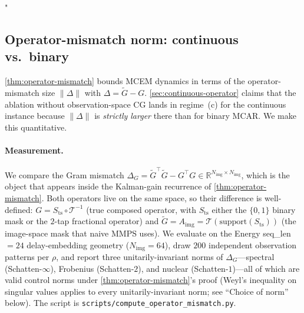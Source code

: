 "\documentclass{article}
\theoremstyle{plain}
\theoremstyle{definition}
\theoremstyle{remark}
\newcommand{\tsimg}{\mathcal{T}}
\newcommand{\imgts}{\mathcal{T}^{-1}}
\newcommand{\Nimg}{N_{\mathrm{img}}}
\newcommand{\Aimg}{A_{\mathrm{img}}}
\begin{document}
\subsection{Operator-mismatch norm: continuous vs.\ binary}
\label{app:continuous-mismatch-norm}

\cref{thm:operator-mismatch} bounds MCEM dynamics in terms of the operator-mismatch size $\|\Delta\|$ with $\Delta = \tilde{G} - G$. \cref{sec:continuous-operator} claims that the ablation without observation-space CG lands in regime~(c) for the continuous instance because $\|\Delta\|$ is \emph{strictly larger} there than for binary MCAR. We make this quantitative.

\paragraph{Measurement.}
We compare the Gram mismatch $\Delta_G = \tilde{G}^{\top}\tilde{G} - G^{\top} G \in \mathbb{R}^{\Nimg \times \Nimg}$, which is the object that appears inside the Kalman-gain recurrence of \cref{thm:operator-mismatch}. Both operators live on the same space, so their difference is well-defined: $G = S_{\mathrm{ts}} \circ \imgts$ (true composed operator, with $S_{\mathrm{ts}}$ either the $\{0,1\}$ binary mask or the $2$-tap fractional operator) and $\tilde{G} = \Aimg = \tsimg(\mathrm{support}(S_{\mathrm{ts}}))$ (the image-space mask that naive MMPS uses). We evaluate on the Energy seq\_len $=24$ delay-embedding geometry ($\Nimg = 64$), draw $200$ independent observation patterns per $\rho$, and report three unitarily-invariant norms of $\Delta_G$---spectral (Schatten-$\infty$), Frobenius (Schatten-$2$), and nuclear (Schatten-$1$)---all of which are valid control norms under \cref{thm:operator-mismatch}'s proof (Weyl's inequality on singular values applies to every unitarily-invariant norm; see ``Choice of norm'' below). The script is \texttt{scripts/compute\_operator\_mismatch.py}.
\end{document}
